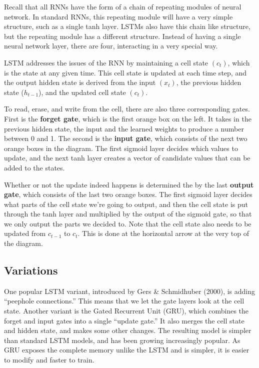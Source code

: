 \documentclass[
]{book}
\begin{document}
Recall that all RNNs have the form of a chain of repeating modules of neural network. In standard RNNs, this repeating module will have a very simple structure, such as a single tanh layer. LSTMs also have this chain like structure, but the repeating module has a different structure. Instead of having a single neural network layer, there are four, interacting in a very special way.

LSTM addresses the issues of the RNN by maintaining a cell state \((c_t)\), which is the state at any given time. This cell state is updated at each time step, and the output hidden state is derived from the input \((x_t)\), the previous hidden state (\(h_{t-1}\)), and the updated cell state \((c_t)\).

To read, erase, and write from the cell, there are also three corresponding gates. First is the \textbf{forget gate}, which is the first orange box on the left. It takes in the previous hidden state, the input and the learned weights to produce a number between 0 and 1. The second is the \textbf{input gate}, which consists of the next two orange boxes in the diagram. The first sigmoid layer decides which values to update, and the next tanh layer creates a vector of candidate values that can be added to the states.

Whether or not the update indeed happens is determined the by the last \textbf{output gate}, which consists of the last two orange boxes. The first sigmoid layer decides what parts of the cell state we're going to output, and then the cell state is put through the tanh layer and multiplied by the output of the sigmoid gate, so that we only output the parts we decided to. Note that the cell state also needs to be updated from \(c_{t-1}\) to \(c_t\). This is done at the horizontal arrow at the very top of the diagram.

\hypertarget{variations}{%
\subsection{Variations}\label{variations}}

One popular LSTM variant, introduced by Gers \& Schmidhuber (2000), is adding ``peephole connections.'' This means that we let the gate layers look at the cell state. Another variant is the Gated Recurrent Unit (GRU), which combines the forget and input gates into a single ``update gate.'' It also merges the cell state and hidden state, and makes some other changes. The resulting model is simpler than standard LSTM models, and has been growing increasingly popular. As GRU exposes the complete memory unlike the LSTM and is simpler, it is easier to modify and faster to train.
\end{document}
